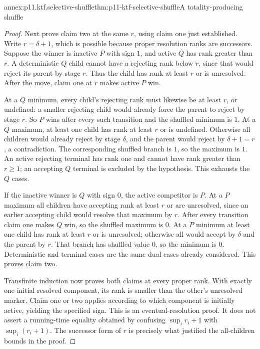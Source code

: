 \begin{annexitem}{annex:p11.ktf.selective-shuffle}{thm:p11-ktf-selective-shuffle}{A totality-producing shuffle}
\begin{proof}
Next prove claim two at the same \(r\), using claim one
just established. Write \(r=\delta+1\), which is possible
because proper resolution ranks are successors. Suppose the winner
is inactive \(P\) with sign \(1\), and active \(Q\)
has rank greater than \(r\). A deterministic \(Q\) child
cannot have a rejecting rank below \(r\), since that would
reject its parent by stage \(r\). Thus the child has rank
at least \(r\) or is unresolved. After the move, claim one
at \(r\) makes active \(P\) win.

At a \(Q\) minimum, every child's rejecting rank must likewise
be at least \(r\), or undefined: a smaller rejecting child
would already force the parent to reject by stage \(r\).
So \(P\) wins after every such transition and the shuffled
minimum is \(1\). At a \(Q\) maximum, at least one
child has rank at least \(r\) or is undefined. Otherwise
all children would already reject by stage \(\delta\), and
the parent would reject by \(\delta+1=r\), a contradiction.
The corresponding shuffled branch is \(1\), so the maximum
is \(1\). An active rejecting terminal has rank one and
cannot have rank greater than \(r\geq1\); an accepting
\(Q\) terminal is excluded by the hypothesis. This exhausts
the \(Q\) cases.

If the inactive winner is \(Q\) with sign \(0\), the
active competitor is \(P\). At a \(P\) maximum all
children have accepting rank at least \(r\) or are unresolved,
since an earlier accepting child would resolve that maximum by
\(r\). After every transition claim one makes \(Q\)
win, so the shuffled maximum is \(0\). At a \(P\)
minimum at least one child has rank at least \(r\) or is
unresolved; otherwise all would accept by \(\delta\) and
the parent by \(r\). That branch has shuffled value \(0\),
so the minimum is \(0\). Deterministic and terminal cases
are the same dual cases already considered. This proves claim two.

Transfinite induction now proves both claims at every proper rank.
With exactly one initial resolved component, its rank is smaller
than the other's unresolved marker. Claim one or two applies
according to which component is initially active, yielding the
specified sign. This is an eventual-resolution proof. It does not
assert a running-time equality obtained by confusing
\(\sup_i r_i+1\) with \(\sup_i(r_i+1)\).
The successor form of \(r\) is precisely what justified the
all-children bounds in the proof.
\end{proof}
\end{annexitem}

